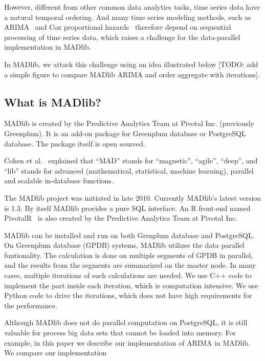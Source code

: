 \documentclass[english,12pt]{article}
\begin{document}
However, different from other common data analytics tasks, time series
data have a natural temporal ordering. And many time series modeling
methods, such as ARIMA~\cite{arima} and Cox proportional
hazards~\cite{cox} therefore depend on sequential processing of time
series data, which raises a challenge for the data-parallel
implementation in MADlib.

In MADlib, we attack this challenge using an idea illustrated below
[TODO: add a simple figure to compare MADlib ARIMA and order aggregate
with iterations].


\subsection{What is MADlib?}


MADlib is created by the Predictive Analytics Team at Pivotal Inc. (previously
Greenplum). It is an add-on package for Greenplum database or PostgreSQL
database. The package itself is open sourced.

Cohen et al.~\cite{mad-skills} explained that ``MAD'' stands for ``magnetic'',
``agile'', ``deep'', and ``lib'' stands for advanced (mathematical, statistical,
machine learning), parallel and scalable in-database functions.

The MADlib project was initiated in late 2010. Currently MADlib's latest
version is 1.3. By itself MADlib provides a pure SQL interface. An R
front-end named PivotalR~\cite{pivotalr} is also created by the
Predictive Analytics Team at Pivotal Inc.


MADlib can be installed and run on both Grenplum database and PostgreSQL\@. On
Greenplum database (GPDB) systems, MADlib utilizes the data parallel
funtionality. The calculation is done on multiple segments of GPDB in parallel,
and the results from the segments are summarized on the master node. In many
cases, multiple iterations of such calculations are needed. We use C++ code to
implement the part inside each iteration, which is computation intensive. We
use Python code to drive the iterations, which does not have high requirements
for the performance.

Although MADlib does not do parallel computation on PostgreSQL, it is
still valuable for process big data sets that cannot be loaded into
memory. For example, in this paper we describe our implementation of
ARIMA in MADlib. We compare our implementation 
\end{document}
